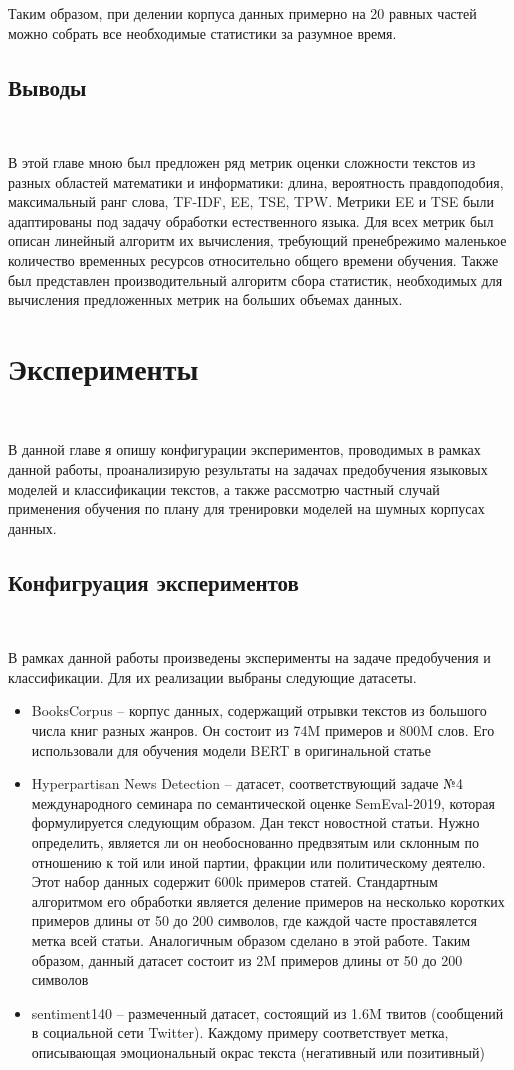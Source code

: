 \documentclass{spbau-diploma}
\begin{document}
Таким образом, при делении корпуса данных примерно на 20 равных частей можно собрать все необходимые статистики за разумное время.
\pagebreak
\subsection{Выводы}
\ 

В этой главе мною был предложен ряд метрик оценки сложности текстов из разных областей математики и информатики: длина, вероятность правдоподобия, максимальный ранг слова, TF-IDF, EE, TSE, TPW. Метрики EE и TSE были адаптированы под задачу обработки естественного языка. Для всех метрик был описан линейный алгоритм их вычисления, требующий пренебрежимо маленькое количество временных ресурсов относительно общего времени обучения. Также был представлен производительный алгоритм сбора статистик, необходимых для вычисления предложенных метрик на больших объемах данных.

\section{Эксперименты} \label{sec:experiments}
\ 

В данной главе я опишу конфигурации экспериментов, проводимых в рамках данной работы, проанализирую результаты на задачах предобучения языковых моделей и классификации текстов, а также рассмотрю частный случай применения обучения по плану для тренировки моделей на шумных корпусах данных.

\subsection{Конфигруация экспериментов}
\ 

В рамках данной работы произведены эксперименты на задаче предобучения и классификации. Для их реализации выбраны следующие датасеты.

\begin{itemize}
	\item BooksCorpus -- корпус данных, содержащий отрывки текстов из большого числа книг разных жанров. Он состоит из 74M примеров и 800M слов. Его использовали для обучения модели BERT в оригинальной статье~\cite{devlin2018bert}
	\item Hyperpartisan News Detection -- датасет, соответствующий задаче №4 международного семинара по семантической оценке SemEval-2019, которая формулируется следующим образом. Дан текст новостной статьи. Нужно определить, является ли он необоснованно предвзятым или склонным по отношению к той или иной партии, фракции или политическому деятелю. Этот набор данных содержит 600k примеров статей. Стандартным алгоритмом его обработки является деление примеров на несколько коротких примеров длины от 50 до 200 символов, где каждой часте проставялется метка всей статьи. Аналогичным образом сделано в этой работе. Таким образом, данный датасет состоит из 2M примеров длины от 50 до 200 символов
	\item sentiment140 -- размеченный датасет, состоящий из 1.6M твитов (сообщений в социальной сети Twitter). Каждому примеру соответствует метка, описывающая эмоциональный окрас текста (негативный или позитивный)
\end{itemize}
\end{document}
